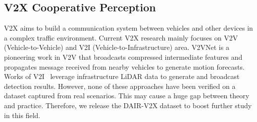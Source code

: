 \subsection{V2X Cooperative Perception}
V2X aims to build a communication system between vehicles and other devices in a complex traffic environment. Current V2X research mainly focuses on V2V (Vehicle-to-Vehicle) and V2I (Vehicle-to-Infrastructure) area. V2VNet\cite{Wang2020V2VNetVC} is a pioneering work in V2V that broadcasts compressed intermediate features and propagates message received from nearby vehicles to generate motion forecasts.  Works of V2I~\cite{Cui2019Automatic, ZHAO2019Detection} leverage infrastructure LiDAR data to generate and broadcast detection results. 
However, none of these approaches have been verified on a dataset captured from real scenarios. This may cause a huge gap between theory and practice. Therefore, we release the DAIR-V2X dataset to boost further study in this field.